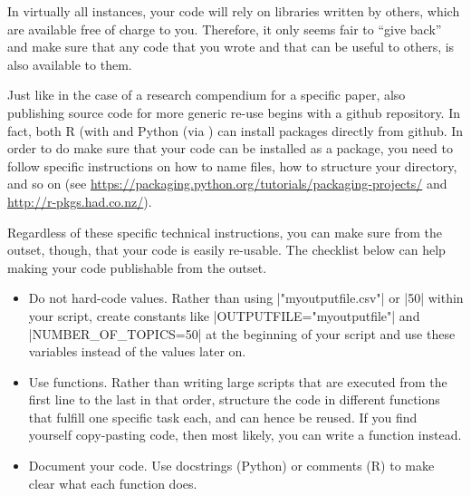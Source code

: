 In virtually all instances, your code will rely on libraries written
by others, which are available free of charge to you. Therefore,
it only seems fair to ``give back'' and make sure that any code that
you wrote and that can be useful to others, is also available to them.

Just like in the case of a research compendium for a specific paper,
also publishing source code for more generic re-use begins with a
github repository. In fact, both R (with  and Python
(via ) can install packages directly from github. In order
to do make sure that your code can be installed as a package, you
need to follow specific instructions on how to name files, how to
structure your directory, and so on (see \url{https://packaging.python.org/tutorials/packaging-projects/}
and \url{http://r-pkgs.had.co.nz/}).

Regardless of these specific technical instructions, you can make
sure from the outset, though, that your code is easily re-usable.
The checklist below can help making your code publishable from the
outset.

\begin{itemize}
\item Do not hard-code values. Rather than using |"myoutputfile.csv"| or |50| within your script, create constants like |OUTPUTFILE="myoutputfile"| and |NUMBER_OF_TOPICS=50| at the beginning of your script and use these variables instead of the values later on.
\item Use functions. Rather than writing large scripts that are executed from the first line to the last in that order, structure the code in different functions that fulfill one specific task each, and can hence be reused. If you find yourself copy-pasting code, then most likely, you can write a function instead.
\item Document your code. Use docstrings (Python) or comments (R) to make clear what each function does.
\end{itemize}

